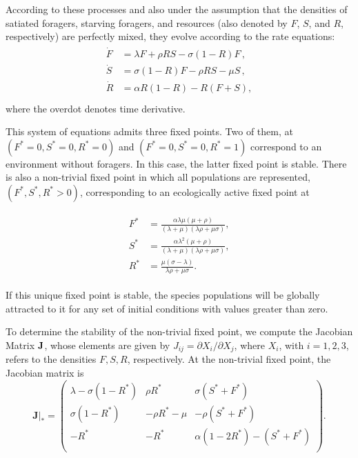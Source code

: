 \documentclass[11pt]{article}
\begin{document}
According to these processes and also under the assumption that the densities
of satiated foragers, starving foragers, and resources (also denoted by $F$,
$S$, and $R$, respectively) are perfectly mixed, they evolve according to the
rate equations:
\begin{align}
  \label{RE}
\begin{split}
\dot F &= \lambda F + \rho  RS - \sigma (1-R)F\,,\\
\dot S &= \sigma (1-R)F - \rho RS - \mu S\,, \\
\dot R &= \alpha R(1-R) -  R(F+S),\\
\end{split}
\end{align}
where the overdot denotes time derivative.

This system of equations admits three fixed points.  Two of them, at
$(F^*\!=\!0,S^*\!=\!0,R^*\!=\!0)$ and $(F^*\!=\!0,S^*\!=\!0,R^*\!=\!1)$
correspond to an environment without foragers.  In this case, the latter
fixed point is stable.  There is also a non-trivial fixed point in which all populations are
represented, $(F^*,S^*,R^*\!>\!0)$, corresponding to an ecologically active
fixed point at

\begin{align}
\begin{split}
F^* &= \frac{\alpha  \lambda  \mu  (\mu +\rho )}{(\lambda +\mu ) (\lambda  \rho +\mu  \sigma )}, \\
S^* &= \frac{\alpha  \lambda ^2 (\mu +\rho )}{(\lambda +\mu ) (\lambda  \rho +\mu  \sigma )}, \\ 
R^* &= 	\frac{\mu  (\sigma -\lambda )}{\lambda  \rho +\mu  \sigma }.
\end{split}
\end{align}

\noindent If this unique fixed point is stable, the species populations
will be globally attracted to it for any set of initial conditions with values greater than zero.

To determine the stability of the non-trivial fixed point, we compute the
Jacobian Matrix $\bf J$, whose elements are given by
$J_{ij}=\partial X_i/\partial X_j$, where $X_i$, with $i=1,2,3$, refers to
the densities $F,S,R$, respectively.  At the non-trivial fixed point, the
Jacobian matrix is
\begin{equation}
\mathbf{J}|_* = 
\left(
\begin{array}{lll}
  \lambda  - \sigma(1-R^*)  & \rho R^* & \sigma(S^*+ F^*) \\
  \sigma(1-R^*) & - \rho R^*-\mu &   -\rho  (S^*+ F^*) \\
  - R^* & - R^* & \alpha(1-2 R^*)-(S^*+F^*) \\
\end{array}
\right).
\end{equation}
\end{document}
